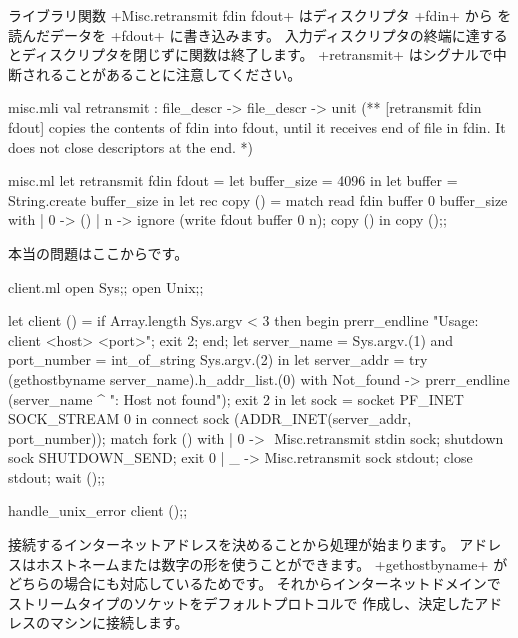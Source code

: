 ライブラリ関数 \ml+Misc.retransmit fdin fdout+ はディスクリプタ \ml+fdin+ から
を読んだデータを \ml+fdout+ に書き込みます。
入力ディスクリプタの終端に達するとディスクリプタを閉じずに関数は終了します。
\ml+retransmit+ はシグナルで中断されることがあることに注意してください。
\begin{codefile}{misc.mli}
val retransmit : file_descr -> file_descr -> unit
(** [retransmit fdin fdout] copies the contents of fdin into fdout, until
it receives end of file in fdin. It does not close descriptors at the
end. *)
\end{codefile}
\begin{listingcodefile}{misc.ml}
let retransmit fdin fdout =
  let buffer_size = 4096 in
  let buffer = String.create buffer_size in
  let rec copy () = match read fdin buffer 0 buffer_size with
    | 0 -> ()
    | n -> ignore (write fdout buffer 0 n); copy ()
  in
  copy ();;
\end{listingcodefile}
本当の問題はここからです。
\begin{listingcodefile}[style=numbers]{client.ml}
open Sys;;
open Unix;;

let client () =
  if Array.length Sys.argv < 3 then begin
    prerr_endline "Usage: client <host> <port>";
    exit 2;
  end;
  let server_name = Sys.argv.(1)
  and port_number = int_of_string Sys.argv.(2) in
  let server_addr =
    try (gethostbyname server_name).h_addr_list.(0)
    with Not_found ->
      prerr_endline (server_name ^ ": Host not found");
      exit 2 in
  let sock = socket PF_INET SOCK_STREAM 0 in
  connect sock (ADDR_INET(server_addr, port_number));
  match fork () with
  | 0 -> $\label{prog:add_signal_ignore}$
      Misc.retransmit stdin sock;
      shutdown sock SHUTDOWN_SEND;
      exit 0
  | _ ->
      Misc.retransmit sock stdout;
      close stdout;
      wait ();;

handle_unix_error client ();;
\end{listingcodefile}

接続するインターネットアドレスを決めることから処理が始まります。
アドレスはホストネームまたは数字の形を使うことができます。
\ml+gethostbyname+ がどちらの場合にも対応しているためです。
それからインターネットドメインでストリームタイプのソケットをデフォルトプロトコルで
作成し、決定したアドレスのマシンに接続します。

